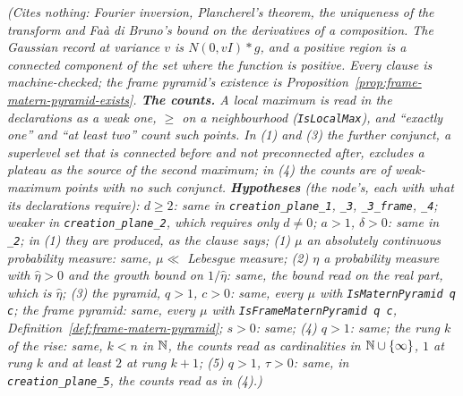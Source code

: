 \begin{proposition}
\statusT\quad\emph{(Cites nothing: Fourier inversion, Plancherel's theorem, the uniqueness of the
transform and Faà di Bruno's bound on the derivatives of a composition. The Gaussian record at variance $v$ is $N(0, vI) * g$, and a positive region is a
connected component of the set where the function is positive. Every clause is machine-checked;
the frame pyramid's existence is Proposition~\ref{prop:frame-matern-pyramid-exists}. \textbf{The counts.} A local maximum is read in the
declarations as a weak one, $\ge$ on a neighbourhood (\texttt{IsLocalMax}), and ``exactly one'' and
``at least two'' count such points. In (1) and (3) the further conjunct, a superlevel set that is
connected before and not preconnected after, excludes a plateau as the source of the second
maximum; in (4) the counts are of weak-maximum points with no such conjunct.
\textbf{Hypotheses} (the node's, each with what its declarations require): $d \ge 2$: same in
\texttt{creation\_plane\_1}, \texttt{\_3}, \texttt{\_3\_frame}, \texttt{\_4}; weaker in
\texttt{creation\_plane\_2}, which requires only $d \ne 0$; $a > 1$, $\delta > 0$: same in
\texttt{\_2}; in (1) they are produced, as the clause says; (1) $\mu$ an absolutely continuous
probability measure: same, $\mu \ll$ Lebesgue measure; (2) $\eta$ a probability
measure with $\widehat\eta > 0$ and the growth bound on $1/\widehat\eta$: same, the bound read on the
real part, which is $\widehat\eta$; (3) the \Matern{} pyramid, $q > 1$, $c > 0$: same, every $\mu$
with \texttt{IsMaternPyramid q c}; the frame \Matern{} pyramid: same, every $\mu$ with
\texttt{IsFrameMaternPyramid q c}, Definition~\ref{def:frame-matern-pyramid}; $s > 0$: same;
(4) $q > 1$: same; the rung $k$ of the rise: same, $k < n$ in $\mathbb{N}$, the counts read as
cardinalities in $\mathbb{N} \cup \{\infty\}$, $1$ at rung $k$ and at least $2$ at rung $k + 1$;
(5) $q > 1$, $\tau > 0$: same, in \texttt{creation\_plane\_5}, the counts read as in (4).)}
\end{proposition}

